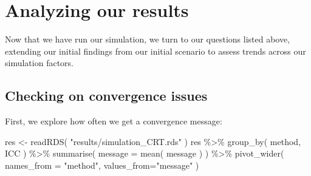 \documentclass[
]{book}
\newenvironment{Shaded}{\begin{snugshade}}{\end{snugshade}}
\newcommand{\AttributeTok}[1]{\textcolor[rgb]{0.77,0.63,0.00}{#1}}
\newcommand{\DecValTok}[1]{\textcolor[rgb]{0.00,0.00,0.81}{#1}}
\newcommand{\FunctionTok}[1]{\textcolor[rgb]{0.00,0.00,0.00}{#1}}
\newcommand{\NormalTok}[1]{#1}
\newcommand{\OtherTok}[1]{\textcolor[rgb]{0.56,0.35,0.01}{#1}}
\newcommand{\SpecialCharTok}[1]{\textcolor[rgb]{0.00,0.00,0.00}{#1}}
\newcommand{\StringTok}[1]{\textcolor[rgb]{0.31,0.60,0.02}{#1}}
\begin{document}
\begin{Shaded}
\end{Shaded}

\hypertarget{analyzing-our-results}{%
\section{Analyzing our results}\label{analyzing-our-results}}

Now that we have run our simulation, we turn to our questions listed above, extending our initial findings from our initial scenario to assess trends across our simulation factors.

\hypertarget{checking-on-convergence-issues}{%
\subsection{Checking on convergence issues}\label{checking-on-convergence-issues}}

First, we explore how often we get a convergence message:

\begin{Shaded}
\begin{Highlighting}[]
\NormalTok{res }\OtherTok{\textless{}{-}} \FunctionTok{readRDS}\NormalTok{( }\StringTok{"results/simulation\_CRT.rds"}\NormalTok{ )}
\NormalTok{res }\SpecialCharTok{\%\textgreater{}\%} 
  \FunctionTok{group\_by}\NormalTok{( method, ICC ) }\SpecialCharTok{\%\textgreater{}\%}
  \FunctionTok{summarise}\NormalTok{( }\AttributeTok{message =} \FunctionTok{mean}\NormalTok{( message ) ) }\SpecialCharTok{\%\textgreater{}\%}
  \FunctionTok{pivot\_wider}\NormalTok{( }\AttributeTok{names\_from =} \StringTok{"method"}\NormalTok{, }\AttributeTok{values\_from=}\StringTok{"message"}\NormalTok{ )}
\end{Highlighting}
\end{Shaded}
\end{document}
